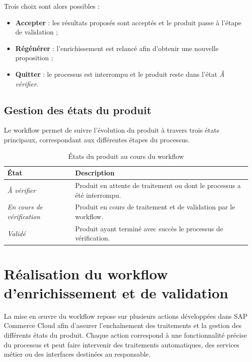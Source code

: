 Trois choix sont alors possibles :

\begin{itemize}
\item \textbf{Accepter} : les résultats proposés sont acceptés et le produit passe à l'étape de validation ;
\item \textbf{Régénérer} : l'enrichissement est relancé afin d'obtenir une nouvelle proposition ;
\item \textbf{Quitter} : le processus est interrompu et le produit reste dans l'état \textit{À vérifier}.
\end{itemize}

\subsection{Gestion des états du produit}

Le workflow permet de suivre l'évolution du produit à travers trois états principaux, correspondant aux différentes étapes du processus.

\begin{table}[H]
\centering
\caption{États du produit au cours du workflow}
\label{tab:etats_produit}
\renewcommand{\arraystretch}{1.4}
\begin{tabular}{|p{5cm}|p{9.5cm}|}
\hline
\textbf{État} & \textbf{Description} \\
\hline
\textit{À vérifier} & Produit en attente de traitement ou dont le processus a été interrompu. \\
\hline
\textit{En cours de vérification} & Produit en cours de traitement et de validation par le workflow. \\
\hline
\textit{Validé} & Produit ayant terminé avec succès le processus de vérification. \\
\hline
\end{tabular}
\end{table}

\section{Réalisation du workflow d'enrichissement et de validation}

La mise en œuvre du workflow repose sur plusieurs actions développées dans SAP Commerce Cloud afin d'assurer l'enchaînement des traitements et la gestion des différents états du produit. Chaque action correspond à une fonctionnalité précise du processus et peut faire intervenir des traitements automatiques, des services métier ou des interfaces destinées au responsable.

